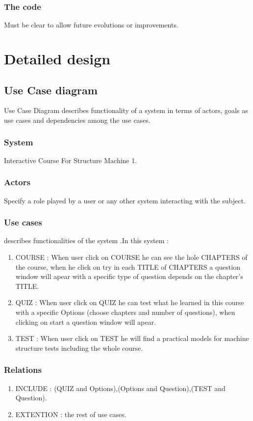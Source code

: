 \subsubsection{The code}
Must be clear to allow future evolutions or improvements.






\section{Detailed design}

\subsection{Use Case diagram}
Use Case Diagram describes functionality of a system in terms of actors, goals as use cases and dependencies among the use cases.\cite{Techopedia-UML}
\subsubsection{System}
Interactive Course For Structure Machine 1.
\subsubsection{Actors}
Specify a role played by a user or any other system interacting with the subject.\cite{Techopedia-UML}
\subsubsection{Use cases}
describes functionalities of the system .In this system :
\begin{enumerate}
	\item COURSE : When user click on COURSE he can see the hole CHAPTERS of the course, when he click on try in each TITLE of CHAPTERS a question window will apear with a specific type of question depends on the chapter's TITLE.
	\item QUIZ : When user click on QUIZ he can test what he learned in this course with a specific Options (choose chapters and number of questions), when clicking on start a question window will apear.
	\item TEST : When user click on TEST he will find a practical models for machine structure tests including the whole course.
\end{enumerate}

\subsubsection{Relations}
\begin{enumerate}
	\item INCLUDE : (QUIZ and Options),(Options and Question),(TEST and Question).
	\item EXTENTION : the rest of use cases.
\end{enumerate}

